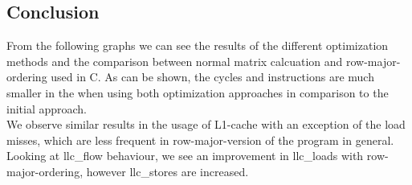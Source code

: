 \documentclass[11pt,a4paper]{article}
\begin{document}
\subsection{Conclusion}
From the following graphs we can see the results of the different optimization methods and the comparison between normal matrix calcuation and row-major-ordering used in C. As can be shown, the cycles and instructions are much smaller in the when using both optimization approaches in comparison to the initial approach. \\
We observe similar results in the usage of L1-cache with an exception of the load misses, which are less frequent in row-major-version of the program in general.\\
Looking at llc\_flow behaviour, we see an improvement in llc\_loads with row-major-ordering, however llc\_stores are increased.
\begin{figure}[h]
\centering
{}\hfill
{}\hfill
{}
\end{figure}
\end{document}

